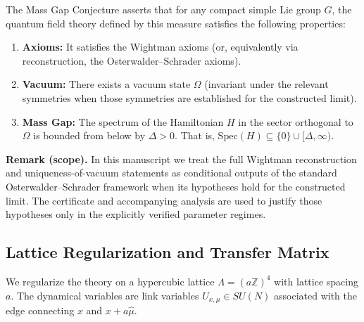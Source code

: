 The Mass Gap Conjecture asserts that for any compact simple Lie group $G$, the quantum field theory defined by this measure satisfies the following properties:
\begin{enumerate}
    \item \textbf{Axioms:} It satisfies the Wightman axioms (or, equivalently via reconstruction, the Osterwalder--Schrader axioms).
    \item \textbf{Vacuum:} There exists a vacuum state $\Omega$ (invariant under the relevant symmetries when those symmetries are established for the constructed limit).
    \item \textbf{Mass Gap:} The spectrum of the Hamiltonian $H$ in the sector orthogonal to $\Omega$ is bounded from below by $\Delta > 0$. That is, $\text{Spec}(H) \subseteq \{0\} \cup [\Delta, \infty)$.
\end{enumerate}

\noindent\textbf{Remark (scope).} In this manuscript we treat the full Wightman reconstruction and uniqueness-of-vacuum statements as conditional outputs of the standard Osterwalder--Schrader framework when its hypotheses hold for the constructed limit. The certificate and accompanying analysis are used to justify those hypotheses only in the explicitly verified parameter regimes.

\subsection{Lattice Regularization and Transfer Matrix}
\label{subsec:transfer}

We regularize the theory on a hypercubic lattice $\Lambda = (a\mathbb{Z})^4$ with lattice spacing $a$. The dynamical variables are link variables $U_{x,\mu} \in SU(N)$ associated with the edge connecting $x$ and $x+a\hat{\mu}$.

